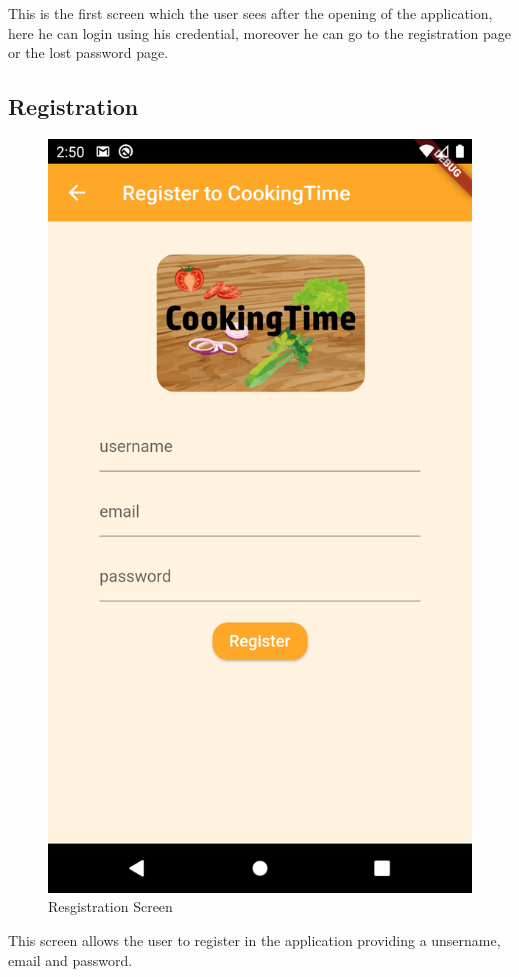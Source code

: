 This is the first screen which the user sees after the opening of the application, here he can login using his credential, moreover he can go to the registration page or the lost password page.
\subsection{Registration}
\begin{figure}[H]
	\centering
	\includegraphics{img/Registration.png}
	\caption{Resgistration Screen}
\end{figure}
This screen allows the user to register in the application providing a unsername, email and password.
